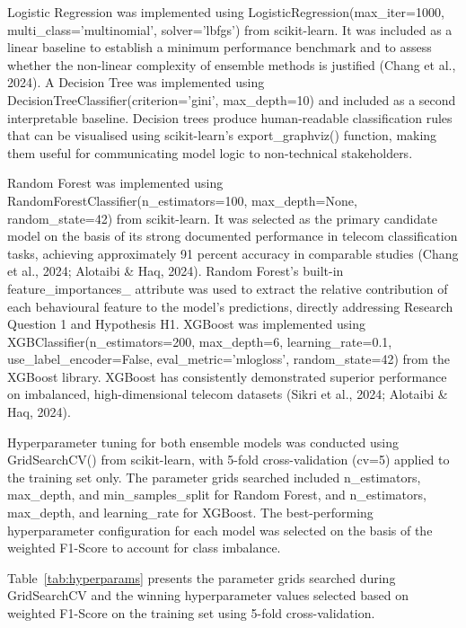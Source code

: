 Logistic Regression was implemented using LogisticRegression(max\_iter=1000, \\multi\_class='multinomial', solver='lbfgs') from scikit-learn. It was included as a linear baseline to establish a minimum performance benchmark and to assess whether the non-linear complexity of ensemble methods is justified (Chang et al., 2024). A Decision Tree was implemented using DecisionTreeClassifier(criterion='gini', max\_depth=10) and included as a second interpretable baseline. Decision trees produce human-readable classification rules that can be visualised using scikit-learn's export\_graphviz() function, making them useful for communicating model logic to non-technical stakeholders.

Random Forest was implemented using RandomForestClassifier(n\_estimators=100, max\_depth=None, random\_state=42) from scikit-learn. It was selected as the primary candidate model on the basis of its strong documented performance in telecom classification tasks, achieving approximately 91 percent accuracy in comparable studies (Chang et al., 2024; Alotaibi \& Haq, 2024). Random Forest's built-in feature\_importances\_ attribute was used to extract the relative contribution of each behavioural feature to the model's predictions, directly addressing Research Question 1 and Hypothesis H1. XGBoost was implemented using XGBClassifier(n\_estimators=200, max\_depth=6, learning\_rate=0.1, use\_label\_encoder=False, eval\_metric='mlogloss', random\_state=42) from the XGBoost library. XGBoost has consistently demonstrated superior performance on imbalanced, high-dimensional telecom datasets (Sikri et al., 2024; Alotaibi \& Haq, 2024).

Hyperparameter tuning for both ensemble models was conducted using GridSearchCV() from scikit-learn, with 5-fold cross-validation (cv=5) applied to the training set only. The parameter grids searched included n\_estimators, max\_depth, and min\_samples\_split for Random Forest, and n\_estimators, max\_depth, and learning\_rate for XGBoost. The best-performing hyperparameter configuration for each model was selected on the basis of the weighted F1-Score to account for class imbalance.


Table~\ref{tab:hyperparams} presents the parameter grids searched during
GridSearchCV and the winning hyperparameter values selected based on weighted
F1-Score on the training set using 5-fold cross-validation.


